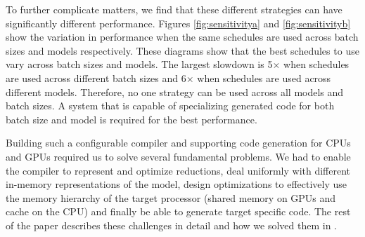 To further complicate matters, we find that these different strategies can have significantly different
performance. Figures \ref{fig:sensitivitya} and \ref{fig:sensitivityb} show the
variation in performance when the same schedules are used across batch sizes 
and models respectively. These diagrams show that the best schedules to use 
vary across batch sizes and models. The largest slowdown is 5$\times$ when 
schedules are used across different batch sizes and 6$\times$ when schedules
are used across different models. Therefore, no one strategy can be used 
across all models and batch sizes. 
A system that is capable of specializing generated code for both batch 
size and model is required for the best performance.

Building such a configurable compiler and supporting code generation for CPUs and GPUs 
required us to solve several fundamental problems. We had to enable the
compiler to represent and optimize reductions, deal uniformly with different
in-memory representations of the model, design optimizations to effectively 
use the memory hierarchy of the target processor (shared memory on GPUs and 
cache on the CPU) and finally be able to generate target specific code. 
The rest of the paper describes these challenges in detail and how we
solved them in \Treebeard{}.

